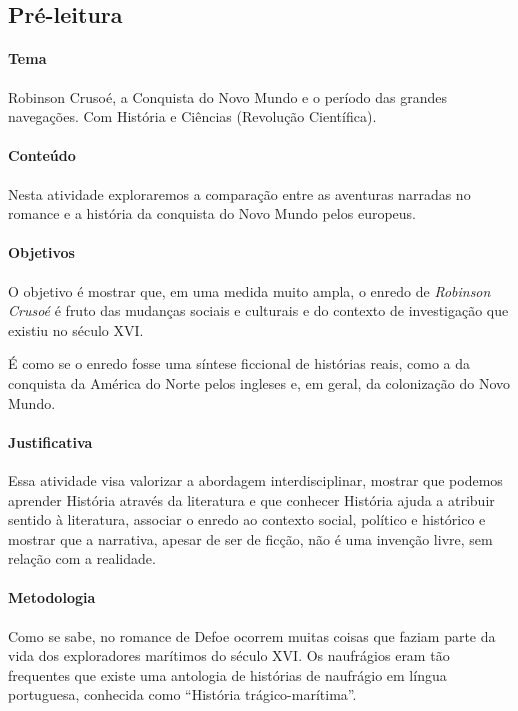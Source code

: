 \documentclass[12pt]{extarticle}
\begin{document}
\subsection{Pré-leitura}

\paragraph{Tema} Robinson Crusoé, a Conquista do Novo Mundo e o período das
grandes navegações. Com História e Ciências (Revolução Científica).


\paragraph{Conteúdo}
Nesta atividade exploraremos a comparação entre as aventuras narradas no
romance e a história da conquista do Novo Mundo pelos europeus.

\paragraph{Objetivos}
O objetivo é mostrar que, em uma medida muito ampla, o enredo de
\emph{Robinson Crusoé} é fruto das mudanças sociais e culturais e do
contexto de investigação que existiu no século XVI.

É como se o enredo fosse uma síntese ficcional de histórias reais, como
a da conquista da América do Norte pelos ingleses e, em geral, da
colonização do Novo Mundo.

\paragraph{Justificativa}
Essa atividade visa valorizar a abordagem interdisciplinar, mostrar que
podemos aprender História através da literatura e que conhecer História
ajuda a atribuir sentido à literatura, associar o enredo ao contexto
social, político e histórico e mostrar que a narrativa, apesar de ser de
ficção, não é uma invenção livre, sem relação com a realidade.

\paragraph{Metodologia}
Como se sabe, no romance de Defoe ocorrem muitas coisas que faziam parte
da vida dos exploradores marítimos do século XVI. Os naufrágios eram tão
frequentes que existe uma antologia de histórias de naufrágio em língua
portuguesa, conhecida como ``História trágico-marítima''.
\end{document}
